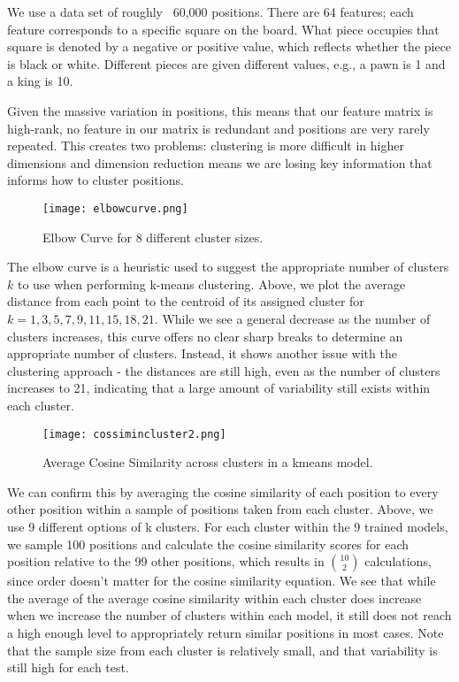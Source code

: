 \documentclass{article}
\begin{document}
We use a data set of roughly ~60,000 positions. There are 64 features; each feature corresponds to a specific square on the board. What piece occupies that square is denoted by a negative or positive value, which reflects whether the piece is black or white. Different pieces are given different values, e.g., a pawn is 1 and a king is 10.

Given the massive variation in positions, this means that our feature matrix is high-rank, no feature in our matrix is redundant and positions are very rarely repeated. This creates two problems: clustering is more difficult in higher dimensions and dimension reduction means we are losing key information that informs how to cluster positions.

\begin{figure}[h]
  \centering
  \texttt{[image: elbowcurve.png]}
  \caption{Elbow Curve for 8 different cluster sizes.}
\end{figure}

The elbow curve is a heuristic used to suggest the appropriate number of clusters $k$ to use when performing k-means clustering. Above, we plot the average distance from each point to the centroid of its assigned cluster for $k = 1,3,5,7,9,11,15,18,21$. While we see a general decrease as the number of clusters increases, this curve offers no clear sharp breaks to determine an appropriate number of clusters. Instead, it shows another issue with the clustering approach - the distances are still high, even as the number of clusters increases to 21, indicating that a large amount of variability still exists within each cluster.

\begin{figure}[h]
  \centering
  \texttt{[image: cossimincluster2.png]}
  \caption{Average Cosine Similarity across clusters in a kmeans model.}
\end{figure}

We can confirm this by averaging the cosine similarity of each position to every other position within a sample of positions taken from each cluster. Above, we use 9 different options of k clusters. For each cluster within the 9 trained models, we sample 100 positions and calculate the cosine similarity scores for each position relative to the 99 other positions, which results in \(\binom{10}{2}\) calculations, since order doesn't matter for the cosine similarity equation. We see that while the average of the average cosine similarity within each cluster does increase when we increase the number of clusters within each model, it still does not reach a high enough level to appropriately return similar positions in most cases. Note that the sample size from each cluster is relatively small, and that variability is still high for each test.
\end{document}
